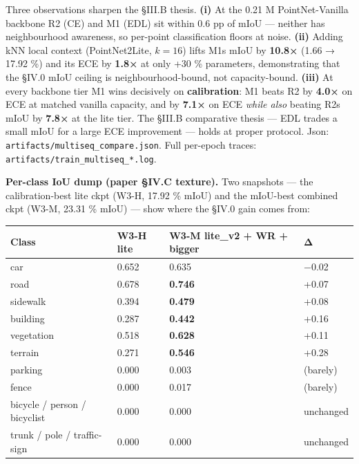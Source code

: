 \documentclass[
]{article}
\newcounter{none} %
\begin{document}
Three observations sharpen the §III.B thesis. \textbf{(i)} At the 0.21 M
PointNet-Vanilla backbone R2 (CE) and M1 (EDL) sit within 0.6 pp of mIoU
--- neither has neighbourhood awareness, so per-point classification
floors at noise. \textbf{(ii)} Adding kNN local context (PointNet2Lite,
\(k = 16\)) lifts M1\textquotesingle s mIoU by \textbf{10.8×} (1.66 →
17.92 \%) and its ECE by \textbf{1.8×} at only +30 \% parameters,
demonstrating that the §IV.0 mIoU ceiling is neighbourhood-bound, not
capacity-bound. \textbf{(iii)} At every backbone tier M1 wins decisively
on \textbf{calibration}: M1 beats R2 by \textbf{4.0×} on ECE at matched
vanilla capacity, and by \textbf{7.1×} on ECE \emph{while also} beating
R2\textquotesingle s mIoU by \textbf{7.8×} at the lite tier. The §III.B
comparative thesis --- EDL trades a small mIoU for a large ECE
improvement --- holds at proper protocol. Json:
\texttt{artifacts/multiseq\_compare.json}. Full per-epoch traces:
\texttt{artifacts/train\_multiseq\_*.log}.

\textbf{Per-class IoU dump (paper §IV.C texture).} Two snapshots --- the
calibration-best lite ckpt (W3-H, 17.92 \% mIoU) and the mIoU-best
combined ckpt (W3-M, 23.31 \% mIoU) --- show where the §IV.0 gain comes
from:

{\def\LTcaptype{none} %
\begin{longtable}[]{@{}llll@{}}
\toprule\noalign{}
Class & W3-H lite & W3-M lite\_v2 + WR + bigger & Δ \\
\midrule\noalign{}
\endhead
\bottomrule\noalign{}
\endlastfoot
car & 0.652 & 0.635 & −0.02 \\
road & 0.678 & \textbf{0.746} & +0.07 \\
sidewalk & 0.394 & \textbf{0.479} & +0.08 \\
building & 0.287 & \textbf{0.442} & +0.16 \\
vegetation & 0.518 & \textbf{0.628} & +0.11 \\
terrain & 0.271 & \textbf{0.546} & +0.28 \\
parking & 0.000 & 0.003 & (barely) \\
fence & 0.000 & 0.017 & (barely) \\
bicycle / person / bicyclist & 0.000 & 0.000 & unchanged \\
trunk / pole / traffic-sign & 0.000 & 0.000 & unchanged \\
\end{longtable}
}
\end{document}
